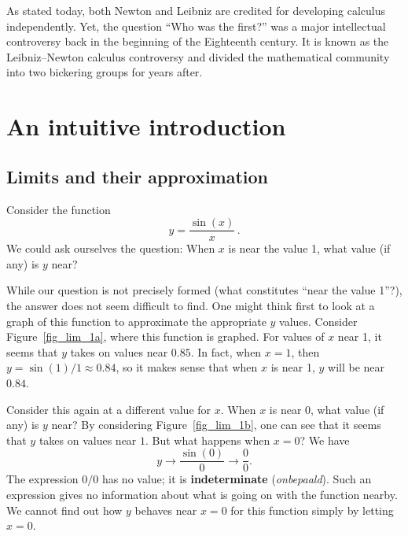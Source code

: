 \ifcourse
\begin{remark}
As stated today, both Newton and Leibniz are credited for developing calculus independently. Yet, the question ``Who was the first?'' was a major intellectual controversy back in the beginning of the Eighteenth century. It is known as the Leibniz--Newton calculus controversy and divided the mathematical community into two bickering groups for years after.
\end{remark}
\fi

\section{An intuitive introduction}
\label{sec:limit_intro}
\subsection{Limits and their approximation}
Consider the function 
\begin{equation}
y = \frac{\sin (x)}{x}\,.
\label{sinxopx}
\end{equation}
We could ask ourselves the question: When $x$ is near the value 1, what value (if any) is $y$ near?%

While our question is not precisely formed (what constitutes ``near the value 1''?), the answer does not seem difficult to find. One might think first to look at a graph of this function to approximate the appropriate $y$ values. Consider Figure~\ref{fig_lim_1a}, where this function is graphed. For values of $x$ near 1, it seems that $y$ takes on values near $0.85$. In fact, when $x=1$, then $y=\sin (1)/1 \approx 0.84$, so it makes sense that when $x$ is near 1, $y$ will be near $0.84$.

Consider this again at a different value for $x$. When $x$ is near 0, what value (if any) is $y$ near? By considering Figure~\ref{fig_lim_1b}, one can see that it seems that $y$ takes on values near $1$. But what happens when $x=0$? We have 
$$ y \rightarrow \frac{\sin (0)}{0} \rightarrow \dfrac{0}{0}.
$$ 
The expression $0/0$ has no value; it is \textbf{indeterminate} (\textit{onbepaald}). Such an expression gives no information about what is going on with the function nearby. We cannot find out how $y$ behaves near $x=0$ for this function simply by letting $x=0$. 


